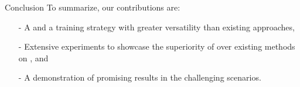 \begin{subsectionframemod}{Conclusion}
To summarize, our contributions are:
\begin{itemize}
    \item[-]  A  and a training strategy with greater versatility than existing approaches,
    \item[-]  Extensive experiments to showcase the superiority of  over existing  methods on , and
    \item[-]  A demonstration of promising results in the challenging  scenarios.
\end{itemize}


\end{subsectionframemod}